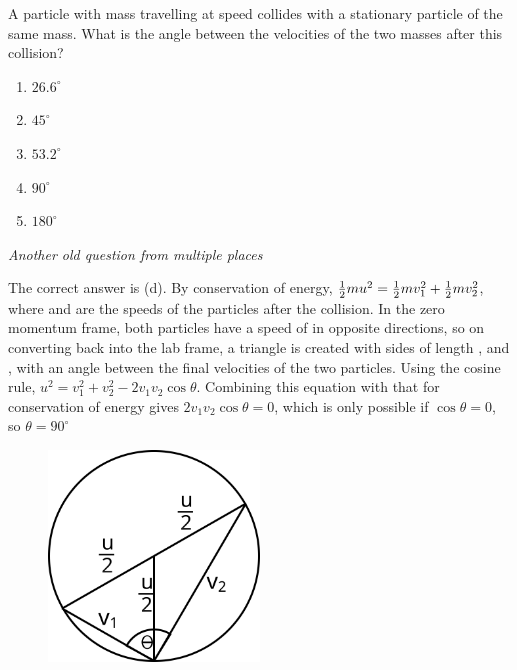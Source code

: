 
\begin{problem} 
{A particle with mass  travelling at speed   collides with a stationary particle of the same mass. What is the angle between the velocities of the two masses after this collision?
\begin{enumerate}
	\item $26.6^{\circ}$
	\item $45^{\circ}$
	\item $53.2^{\circ}$
	\item $90^{\circ}$ \answer
	\item $180^{\circ}$
\end{enumerate}
}
{\textit{Another old question from multiple places}}
{The correct answer is (d). By conservation of energy, ${\textstyle \frac{1}{2}} mu^2 = {\textstyle \frac{1}{2}} mv_1^2 + {\textstyle \frac{1}{2}} mv_2^2$, where  and  are the speeds of the particles after the collision. In the zero momentum frame, both particles have a speed of  in opposite directions, so on converting back into the lab frame, a triangle is created with sides of length  ,   and  , with an angle \vari{\theta} between the final velocities of the two particles. Using the cosine rule, $u^2 = v_1^2 +v_2^2 - 2 v_1 v_2 \cos \theta$. Combining this equation with that for conservation of energy gives $2 v_1 v_2 \cos \theta = 0$, which is only possible if $\cos \theta = 0$, so $\theta = 90^{\circ}$

\begin{figure}[h]
	\centering
	\includegraphics[width=0.5\textwidth]{../../../figures/dynamics_angle_between_identical_masses.svg}
	\caption{}
	\label{fig:Dynamics_angle_between_identical_masses}
\end{figure}


}
\end{problem}